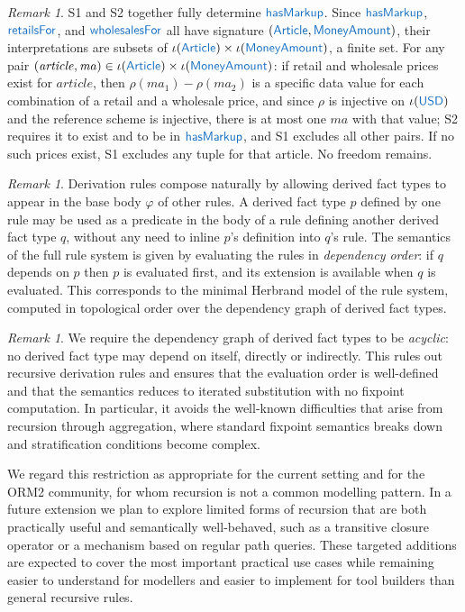 \documentclass[11pt]{amsart}
\theoremstyle{definition}
\theoremstyle{remark}
\newtheorem{remark}[theorem]{Remark}
\newcommand{\pr}[1]{\mathsf{\textcolor{RoyalBlue}{#1}}}
\begin{document}
\begin{remark}
S1 and S2 together fully determine $\pr{hasMarkup}$. Since
$\pr{hasMarkup}$, $\pr{retailsFor}$, and $\pr{wholesalesFor}$ all have
signature $(\pr{Article}, \pr{MoneyAmount})$, their interpretations are
subsets of $\iota(\pr{Article}) \times \iota(\pr{MoneyAmount})$, a finite
set. For any pair $(\mathit{article}, \mathit{ma}) \in \iota(\pr{Article})
\times \iota(\pr{MoneyAmount})$: if retail and wholesale prices exist for
$\mathit{article}$, then $\rho(\mathit{ma}_1) - \rho(\mathit{ma}_2)$ is a
specific data value for each combination of a retail and a wholesale
price, and since $\rho$ is injective on $\iota(\pr{USD})$ and the reference
scheme is injective, there is at most one $\mathit{ma}$ with that value;
S2 requires it to exist and to be in $\pr{hasMarkup}$, and S1 excludes all
other pairs. If no such prices exist, S1 excludes any
tuple for that article. No freedom remains.
\end{remark}

\begin{remark}
Derivation rules compose naturally by allowing derived fact types to appear
in the base body $\varphi$ of other rules. A derived fact type $p$ defined
by one rule may be used as a predicate in the body of a rule defining
another derived fact type $q$, without any need to inline $p$'s definition
into $q$'s rule. The semantics of the full rule system is given by
evaluating the rules in \emph{dependency order}: if $q$ depends on $p$
then $p$ is evaluated first, and its extension is available when $q$ is
evaluated. This corresponds to the minimal Herbrand model of the rule
system, computed in topological order over the dependency graph of derived
fact types.
\end{remark}

\begin{remark}
We require the dependency graph of derived fact types to be \emph{acyclic}:
no derived fact type may depend on itself, directly or indirectly. This
rules out recursive derivation rules and ensures that the evaluation order
is well-defined and that the semantics reduces to iterated substitution
with no fixpoint computation. In particular, it avoids the well-known
difficulties that arise from recursion through aggregation, where standard
fixpoint semantics breaks down and stratification conditions become complex.

We regard this restriction as appropriate for the current setting and for
the ORM2 community, for whom recursion is not a common modelling pattern.
In a future extension we plan to explore limited forms of recursion that
are both practically useful and semantically well-behaved, such as a
transitive closure operator or a mechanism based on regular path queries.
These targeted additions are expected to cover the most important practical
use cases while remaining easier to understand for modellers and easier to
implement for tool builders than general recursive rules.
\end{remark}
\end{document}
